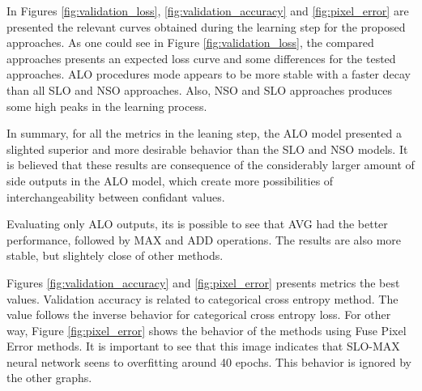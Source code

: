 In Figures \ref{fig:validation_loss}, \ref{fig:validation_accuracy} and \ref{fig:pixel_error} are presented the relevant curves obtained during the learning step for the proposed approaches. As one could see in Figure \ref{fig:validation_loss}, the compared approaches presents an expected loss curve and some differences for the tested approaches. ALO procedures mode appears to be more stable with a faster decay than all SLO and NSO approaches. Also, NSO and SLO approaches produces some high peaks in the learning process.

In summary, for all the metrics in the leaning step, the ALO model presented a slighted superior and more desirable behavior than the SLO and NSO models. It is believed that these results are consequence of the considerably larger amount of side outputs in the ALO model, which create more possibilities of interchangeability between confidant values.

Evaluating only ALO outputs, its is possible to see that AVG had the better performance, followed by MAX and ADD operations. The results are also more stable, but slightely close of other methods.

Figures \ref{fig:validation_accuracy} and \ref{fig:pixel_error} presents metrics the best values. Validation accuracy is related to categorical cross entropy method. The value follows the inverse behavior for categorical cross entropy loss. For other way, Figure \ref{fig:pixel_error} shows the behavior of the methods using Fuse Pixel Error methods. It is important to see that this image indicates that SLO-MAX neural network seens to overfitting around 40 epochs. This behavior is ignored by the other graphs. 

